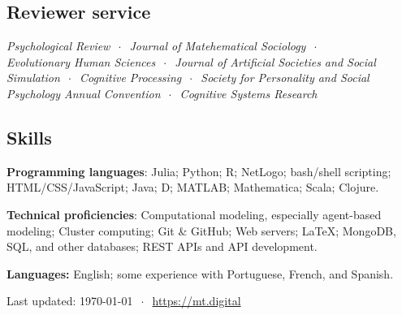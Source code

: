 \documentclass[11pt, letterpaper]{article}
\begin{document}
\vspace{-1em}
\subsection*{Reviewer service}

\emph{Psychological Review} $~\cdot~$ \emph{Journal of Matehematical Sociology} $~\cdot~$ \\
\emph{Evolutionary Human Sciences} $~\cdot~$ \emph{Journal of Artificial Societies and Social Simulation} $~\cdot~$ \emph{Cognitive Processing} $~\cdot~$ \emph{Society for Personality and Social Psychology Annual Convention} $~\cdot~$ \emph{Cognitive Systems Research}

\vspace{-1em}
\subsection*{Skills}

  \textbf{Programming languages}: Julia; Python; R; NetLogo; bash/shell scripting; 
  HTML/CSS/JavaScript; Java; D; MATLAB; Mathematica; Scala; Clojure.

  \textbf{Technical proficiencies}: Computational 
  modeling, especially agent-based modeling; Cluster computing;
  Git \& GitHub; Web servers; \LaTeX; MongoDB, SQL, and other databases; 
  REST APIs and API development.

  \textbf{Languages:} English; some experience with Portuguese, French,
  and Spanish.

\hrulefill

\begin{center}
  {\scriptsize  Last updated: \today\- $~\cdot~$ \- 
\href{mt.digital}{https://mt.digital}}
\end{center}
\end{document}
